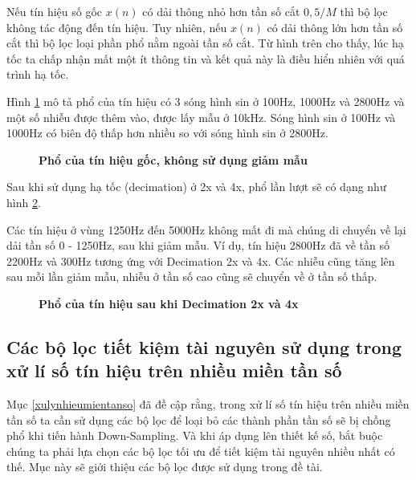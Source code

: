 Nếu tín hiệu số gốc $x(n)$ có dải thông nhỏ hơn tần số cắt $0,5/M$ thì bộ lọc không tác động đến tín hiệu. Tuy nhiên, nếu $x(n)$ có dải thông lớn hơn tần số cắt thì bộ lọc loại phần phổ nằm ngoài tần số cắt. Từ hình trên cho thấy, lúc hạ tốc ta chấp nhận mất một ít thông tin và kết quả này là điều hiển nhiên với quá trình hạ tốc.

 Hình \ref{decimation_without_filtering-no_decimation} mô tả phổ của tín hiệu có 3 sóng hình sin ở 100Hz, 1000Hz và 2800Hz và một số nhiễu được thêm vào, được lấy mẫu ở 10kHz. Sóng hình sin ở 100Hz và 1000Hz có biên độ thấp hơn nhiều so với sóng hình sin ở 2800Hz. 

\begin{figure}[H]
    \centering
    
    \caption[Phổ của tín hiệu gốc, không sử dụng giảm mẫu]{\bfseries \fontsize{12pt}{0pt}\selectfont Phổ của tín hiệu gốc, không sử dụng giảm mẫu}
    \label{decimation_without_filtering-no_decimation}
\end{figure}
Sau khi sử dụng hạ tốc (decimation) ở 2x và 4x, phổ lần lượt sẽ có dạng như hình \ref{decimation_without_filtering-2x_4x_decimation}.

Các tín hiệu ở vùng 1250Hz đến 5000Hz không mất đi mà chúng di chuyển về lại dải tần số 0 - 1250Hz, sau khi giảm mẫu. Ví dụ, tín hiệu 2800Hz đã về tần số 2200Hz và 300Hz tương ứng với Decimation 2x và 4x. Các nhiễu cũng tăng lên sau mỗi lần giảm mẫu, nhiễu ở tần số cao cũng sẽ chuyển về ở tần số thấp.
\begin{figure}[H]
    \centering
    
    \caption[Phổ của tín hiệu sau khi Decimation 2x và 4x]{\bfseries \fontsize{12pt}{0pt}\selectfont Phổ của tín hiệu sau khi Decimation 2x và 4x}
    \label{decimation_without_filtering-2x_4x_decimation}
\end{figure}
 
\subsection{Các bộ lọc tiết kiệm tài nguyên sử dụng trong xử lí số tín hiệu trên nhiều miền tần số}
Mục \ref{xulynhieumientanso} đã đề cập rằng, trong xử lí số tín hiệu trên nhiều miền tần số ta cần sử dụng các bộ lọc để loại bỏ các thành phần tần số sẽ bị chồng phổ khi tiến hành Down-Sampling. Và khi áp dụng lên thiết kế số, bắt buộc chúng ta phải lựa chọn các bộ lọc tối ưu để tiết kiệm tài nguyên nhiều nhất có thế. Mục này sẽ giới thiệu các bộ lọc được sử dụng trong đề tài.
